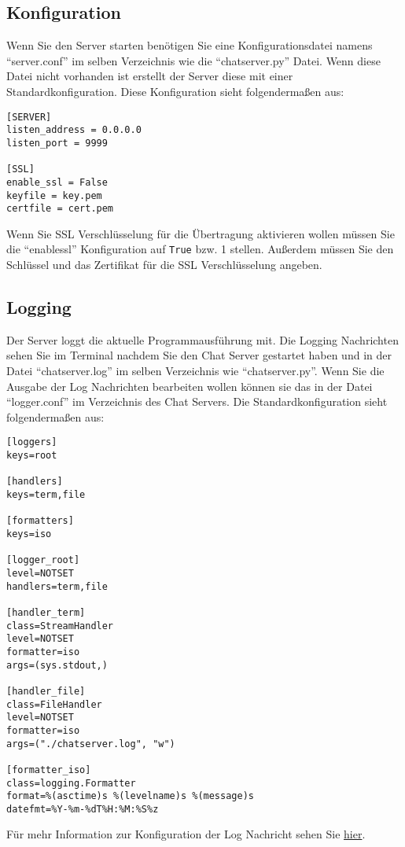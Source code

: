 \documentclass[a4paper,ngerman,headsepline, titlepage=firstiscover]{scrartcl}
\begin{document}
\subsection{Konfiguration}
Wenn Sie den Server starten benötigen Sie eine Konfigurationsdatei namens \enquote{server.conf} im selben Verzeichnis wie die \enquote{chat\textunderscore server.py} Datei. Wenn diese Datei nicht vorhanden ist erstellt der Server diese mit einer Standardkonfiguration. Diese Konfiguration sieht folgendermaßen aus:
\begin{lstlisting}[style=simple]
[SERVER]
listen_address = 0.0.0.0
listen_port = 9999

[SSL]
enable_ssl = False
keyfile = key.pem
certfile = cert.pem
\end{lstlisting}
Wenn Sie SSL Verschlüsselung für die Übertragung aktivieren wollen müssen Sie die \enquote{enable\textunderscore ssl} Konfiguration auf \texttt{True} bzw. 1 stellen. Außerdem müssen Sie den Schlüssel und das Zertifikat für die SSL Verschlüsselung angeben.
\subsection{Logging}
Der Server loggt die aktuelle Programmausführung mit. Die Logging Nachrichten sehen Sie im Terminal nachdem Sie den Chat Server gestartet haben und in der Datei \enquote{chatserver.log} im selben Verzeichnis wie \enquote{chat\textunderscore server.py}. Wenn Sie die Ausgabe der Log Nachrichten bearbeiten wollen können sie das in der Datei \enquote{logger.conf} im Verzeichnis des Chat Servers. Die Standardkonfiguration sieht folgendermaßen aus:
\begin{lstlisting}[style=simple]
[loggers]
keys=root

[handlers]
keys=term,file

[formatters]
keys=iso

[logger_root]
level=NOTSET
handlers=term,file

[handler_term]
class=StreamHandler
level=NOTSET
formatter=iso
args=(sys.stdout,)

[handler_file]
class=FileHandler
level=NOTSET
formatter=iso
args=("./chatserver.log", "w")

[formatter_iso]
class=logging.Formatter
format=%(asctime)s %(levelname)s %(message)s
datefmt=%Y-%m-%dT%H:%M:%S%z 
\end{lstlisting}
Für mehr Information zur Konfiguration der Log Nachricht sehen Sie \href{https://docs.python.org/3/library/logging.config.html#configuration-file-format}{hier}.
\end{document}
